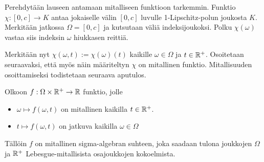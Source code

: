 \documentclass[12pt,oneside,a4paper]{amsbook} %
\begin{document}
Perehdytään lauseen antamaan mitalliseen funktioon tarkemmin. Funktio $ \chi:[0, c] \to K$ antaa jokaiselle välin $[0, c]$ luvulle 1-Lipschitz-polun joukosta $K$. Merkitään jatkossa $\Omega = [0,c]$ ja kutsutaan väliä indeksijoukoksi. Polku $ \chi(\omega)$ vastaa siis indeksin $\omega$ hiukkasen reittiä.

Merkitään nyt $\chi(\omega, t) :=  \chi(\omega)(t)$ kaikille $\omega \in \Omega$ ja $t \in \mathbb{R}^+$. Osoitetaan seuraavaksi, että myös näin määriteltyn $\chi$ on mitallinen funktio. Mitallisuuden osoittamiseksi todistetaan seuraava aputulos.

\begin{lemma}\label{le:caratheodoryIsMeasurable}
    Olkoon $f:\Omega \times {\mathbb{R}^{+}} \to \mathbb{R}$ funktio, jolle
    \begin{itemize}
        \item $\omega \mapsto f(\omega, t)$  on mitallinen kaikilla $t \in {\mathbb{R}^{+}}$.
        \item $t \mapsto f(\omega, t)$ on jatkuva kaikilla $\omega \in \Omega$
    \end{itemize}
    Tällöin $f$ on mitallinen sigma-algebran suhteen, joka saadaan tulona joukkojen $\Omega$ ja ${\mathbb{R}^{+}}$ Lebesgue-mitallisista osajoukkojen kokoelmista.
\end{lemma}
\end{document}
